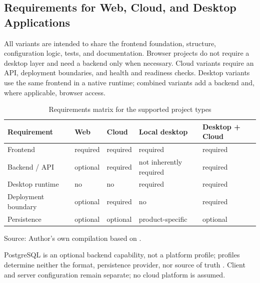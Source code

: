 \subsection{Requirements for Web, Cloud, and Desktop Applications}
\label{subsec:anforderungen-plattformen}

All variants are intended to share the frontend foundation, structure,
configuration logic, tests, and documentation. Browser projects do not require
a desktop layer and need a backend only when necessary. Cloud variants require
an API, deployment boundaries, and health and readiness checks. Desktop
variants use the same frontend in a native runtime; combined variants add a
backend and, where applicable, browser access.

\begin{table}[H]
  \centering
  \scriptsize
  \renewcommand{\arraystretch}{1.08}
  \caption{Requirements matrix for the supported project types}
  \label{tab:plattform-anforderungen}
  \begin{tabularx}{\textwidth}{@{}p{}>{\centering\arraybackslash}X>{\centering\arraybackslash}X>{\centering\arraybackslash}X>{\centering\arraybackslash}X@{}}
    \toprule
    \textbf{Requirement} & \textbf{Web} & \textbf{Cloud} & \textbf{Local desktop} & \textbf{Desktop + Cloud} \\
    \midrule
    Frontend & required & required & required & required \\
    Backend / API & optional & required & not inherently required & required \\
    Desktop runtime & no & no & required & required \\
    Deployment boundary & optional & required & no & required \\
    Persistence & optional & optional & product-specific & optional \\
    \bottomrule
  \end{tabularx}
  \smallskip
  {\footnotesize Source: Author's own compilation based on
  \textcite{kleiveist2026profiles}.\par}
\end{table}

PostgreSQL is an optional backend capability, not a platform profile; profiles
determine neither the format, persistence provider, nor source of truth
\parencite{kleiveist2026profiles,kleiveist2026persistence}. Client and server
configuration remain separate; no cloud platform is assumed.
